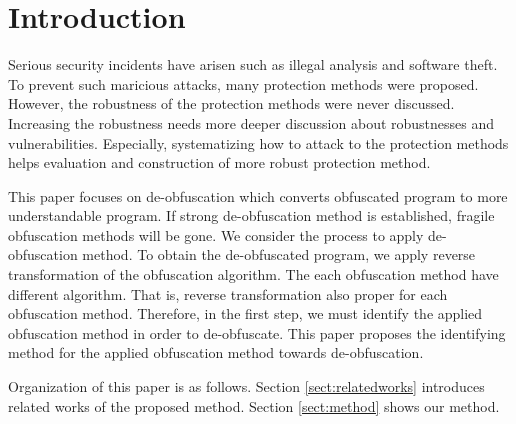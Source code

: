 \documentclass[conference]{IEEEtran}
\begin{document}

%
\IEEEpeerreviewmaketitle

\section{Introduction}

Serious security incidents have arisen such as illegal analysis and
software theft.  To prevent such maricious attacks, many protection
methods were proposed.  However, the robustness of the protection
methods were never discussed.  Increasing the robustness needs more
deeper discussion about robustnesses and vulnerabilities.  Especially,
systematizing how to attack to the protection methods helps evaluation
and construction of more robust protection method.

This paper focuses on de-obfuscation which converts obfuscated program
to more understandable program.  If strong de-obfuscation method is
established, fragile obfuscation methods will be gone.
%
We consider the process to apply de-obfuscation method.
%
To obtain the de-obfuscated program, we apply reverse transformation
of the obfuscation algorithm.  The each obfuscation method have
different algorithm.  That is, reverse transformation also proper for
each obfuscation method.  Therefore, in the first step, we must
identify the applied obfuscation method in order to de-obfuscate.
This paper proposes the identifying method for the applied obfuscation
method towards de-obfuscation.

Organization of this paper is as follows.  Section
\ref{sect:relatedworks} introduces related works of the proposed
method.  Section \ref{sect:method} shows our method.
\end{document}
